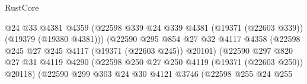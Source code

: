 \begin{lexlean}{RustCore}
\begin{coremodule}
                                          @24
                                          @33
                                          @4381
                                          @4359
                                          (@22598
                                            @339
                                            @24
                                            @339
                                            @4381
                                            (@19371 (@22603 @339))
                                            (@19379 (@19380 @4381)))
                                          (@22590
                                            @295
                                            @854
                                            @27
                                            @32
                                            @4117
                                            @4358
                                            (@22598
                                              @245
                                              @27
                                              @245
                                              @4117
                                              (@19371 (@22603 @245))
                                              @20101)
                                            (@22590
                                              @297
                                              @820
                                              @27
                                              @31
                                              @4119
                                              @4290
                                              (@22598
                                                @250
                                                @27
                                                @250
                                                @4119
                                                (@19371 (@22603 @250))
                                                @20118)
                                              (@22590
                                                @299
                                                @303
                                                @24
                                                @30
                                                @4121
                                                @3746
                                                (@22598
                                                  @255
                                                  @24
                                                  @255

\end{coremodule}
\end{lexlean}

